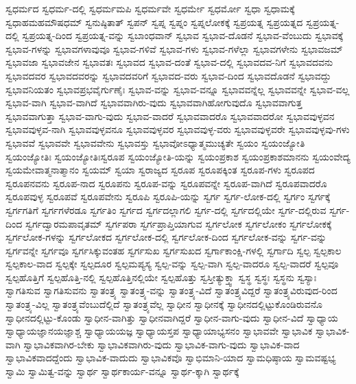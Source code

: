 {ಸ್ವಧರ್ಮದ
ಸ್ವಧರ್ಮ-ದಲ್ಲಿ
ಸ್ವಧರ್ಮಮಪಿ
ಸ್ವಧರ್ಮವೇ
ಸ್ವಧರ್ಮೇ
ಸ್ವಧರ್ಮೋ
ಸ್ವಧಾ
ಸ್ವಧಾಮಕ್ಕೆ
ಸ್ವಧಾಹಮಹಮೌಷಧಮ್
ಸ್ವನುಷ್ಠಿತಾತ್
ಸ್ವಪನ್
ಸ್ವಪ್ನ
ಸ್ವಪ್ನಂ
ಸ್ವಪ್ನಲೋಕಕ್ಕೆ
ಸ್ವಪ್ರಯತ್ನ
ಸ್ವಪ್ರಯತ್ನದ
ಸ್ವಪ್ರಯತ್ನ-ದಲ್ಲಿ
ಸ್ವಪ್ರಯತ್ನ-ದಿಂದ
ಸ್ವಪ್ರಯತ್ನ-ವನ್ನು
ಸ್ವಬಾಂಧವಾನ್
ಸ್ವಭಾವ
ಸ್ವಭಾವ-ದೊಡನೆ
ಸ್ವಭಾವ-ವೆಂಬುದು
ಸ್ವಭಾವಕ್ಕೆ
ಸ್ವಭಾವ-ಗಳನ್ನು
ಸ್ವಭಾವಗಳಾವುವೂ
ಸ್ವಭಾವ-ಗಳಿವೆ
ಸ್ವಭಾವ-ಗಳು
ಸ್ವಭಾವ-ಗಳೆಲ್ಲಾ
ಸ್ವಭಾವಗಳೇನು
ಸ್ವಭಾವಜಮ್
ಸ್ವಭಾವಜಾ
ಸ್ವಭಾವಜೇನ
ಸ್ವಭಾವತಃ
ಸ್ವಭಾವದ
ಸ್ವಭಾವ-ದಂತೆ
ಸ್ವಭಾವ-ದಲ್ಲಿ
ಸ್ವಭಾವದವ-ನಿಗೆ
ಸ್ವಭಾವದವನು
ಸ್ವಭಾವದವರ
ಸ್ವಭಾವದವರನ್ನು
ಸ್ವಭಾವದವರಿಗೆ
ಸ್ವಭಾವದ-ವರು
ಸ್ವಭಾವ-ದಿಂದ
ಸ್ವಭಾವದೊಡನೆ
ಸ್ವಭಾವದ್ದು
ಸ್ವಭಾವನಿಯತಂ
ಸ್ವಭಾವಪ್ರಭವೈರ್ಗುಣೈಃ
ಸ್ವಭಾವ-ವನ್ನು
ಸ್ವಭಾವ-ವನ್ನೂ
ಸ್ವಭಾವವನ್ನೆಲ್ಲ
ಸ್ವಭಾವವನ್ನೇ
ಸ್ವಭಾವ-ವಲ್ಲ
ಸ್ವಭಾವ-ವಾಗಿ
ಸ್ವಭಾವ-ವಾಗಿದೆ
ಸ್ವಭಾವವಾಗಿರು-ವುದು
ಸ್ವಭಾವವಾಗಿಹೋಗುವುದೊ
ಸ್ವಭಾವವಾಗುತ್ತ
ಸ್ವಭಾವವಾಗುತ್ತಾ
ಸ್ವಭಾವ-ವಾಗು-ವುದು
ಸ್ವಭಾವ-ವಾದರೆ
ಸ್ವಭಾವವಾದರೊ
ಸ್ವಭಾವವಾದರೋ
ಸ್ವಭಾವವುಳ್ಳವನ
ಸ್ವಭಾವವುಳ್ಳವ-ನಾಗಿ
ಸ್ವಭಾವವುಳ್ಳವನೂ
ಸ್ವಭಾವವುಳ್ಳವರ
ಸ್ವಭಾವವುಳ್ಳ-ವರು
ಸ್ವಭಾವವುಳ್ಳವರೇ
ಸ್ವಭಾವವುಳ್ಳವು-ಗಳು
ಸ್ವಭಾವವೆ
ಸ್ವಭಾವವೇ
ಸ್ವಭಾವವೇನು
ಸ್ವಭಾವಸ್ತು
ಸ್ವಭಾವೋಽಧ್ಯಾತ್ಮಮುಚ್ಯತೇ
ಸ್ವಯಂ
ಸ್ವಯಂಜ್ಯೋತಿ
ಸ್ವಯಂಜ್ಯೋತಿಃ
ಸ್ವಯಂಜ್ಯೋತಿಃಸ್ವರೂಪ
ಸ್ವಯಂಜ್ಯೋತಿ-ಯನ್ನು
ಸ್ವಯಂಪ್ರಕಾಶ
ಸ್ವಯಂಪ್ರಕಾಶಮಾನನು
ಸ್ವಯಂವೇದ್ಯ
ಸ್ವಯಮೇವಾತ್ಮನಾತ್ಮಾನಂ
ಸ್ವಯಮ್
ಸ್ವಯಾ
ಸ್ವರಾಜ್ಯದ
ಸ್ವರೂಪ
ಸ್ವರೂಪಕ್ಕಿಂತ
ಸ್ವರೂಪ-ಗಳು
ಸ್ವರೂಪದ
ಸ್ವರೂಪನವನು
ಸ್ವರೂಪ-ನಾದ
ಸ್ವರೂಪನು
ಸ್ವರೂಪ-ವನ್ನು
ಸ್ವರೂಪವನ್ನೇ
ಸ್ವರೂಪ-ವಾಗಿದೆ
ಸ್ವರೂಪವಾದರೊ
ಸ್ವರೂಪವುಳ್ಳ
ಸ್ವರೂಪವೆ
ಸ್ವರೂಪವೇನು
ಸ್ವರೂಪಿ
ಸ್ವರೂಪಿ-ಯನ್ನು
ಸ್ವರ್ಗ
ಸ್ವರ್ಗ-ಲೋಕ-ದಲ್ಲಿ
ಸ್ವರ್ಗಂ
ಸ್ವರ್ಗಕ್ಕೆ
ಸ್ವರ್ಗಗತಿಗೆ
ಸ್ವರ್ಗಗಳೆರಡೂ
ಸ್ವರ್ಗತಿಂ
ಸ್ವರ್ಗದ
ಸ್ವರ್ಗದಲ್ಲಾಗಲಿ
ಸ್ವರ್ಗ-ದಲ್ಲಿ
ಸ್ವರ್ಗದಲ್ಲಿಯೇ
ಸ್ವರ್ಗ-ದಲ್ಲಿರುವ
ಸ್ವರ್ಗ-ದಿಂದ
ಸ್ವರ್ಗದ್ವಾರಮಪಾವೃತಮ್
ಸ್ವರ್ಗಪರಾ
ಸ್ವರ್ಗಪ್ರಾಪ್ತಿಯಾಗುವ
ಸ್ವರ್ಗಲೋಕ
ಸ್ವರ್ಗಲೋಕಂ
ಸ್ವರ್ಗಲೋಕಕ್ಕೆ
ಸ್ವರ್ಗಲೋಕ-ಗಳನ್ನು
ಸ್ವರ್ಗಲೋಕದ
ಸ್ವರ್ಗಲೋಕ-ದಲ್ಲಿ
ಸ್ವರ್ಗಲೋಕ-ದಿಂದ
ಸ್ವರ್ಗಲೋಕ-ವನ್ನು
ಸ್ವರ್ಗ-ವನ್ನು
ಸ್ವರ್ಗವನ್ನೇ
ಸ್ವರ್ಗವೂ
ಸ್ವರ್ಗಸಿಕ್ಕುವಂತಹ
ಸ್ವರ್ಗಸುಖ
ಸ್ವರ್ಗಸುಖದ
ಸ್ವರ್ಗಾಕಾಂಕ್ಷಿ-ಗಳಲ್ಲಿ
ಸ್ವರ್ಗಾದಿ
ಸ್ವಲ್ಪ
ಸ್ವಲ್ಪಕಾಲ
ಸ್ವಲ್ಪಕಾಲ-ವಾದ
ಸ್ವಲ್ಪಕ್ಕೇ
ಸ್ವಲ್ಪದೂರ
ಸ್ವಲ್ಪಮಪ್ಯಸ್ಯ
ಸ್ವಲ್ಪ-ವನ್ನು
ಸ್ವಲ್ಪ-ವಾಗಿ
ಸ್ವಲ್ಪ-ವಾದರೂ
ಸ್ವಲ್ಪ-ವಾದರೆ
ಸ್ವಲ್ಪವೂ
ಸ್ವಲ್ಪಹೊತ್ತಿಗೆ
ಸ್ವಲ್ಪಹೊತ್ತಿ-ನಲ್ಲಿ
ಸ್ವಲ್ಪಹೊತ್ತಿನಲ್ಲಿಯೇ
ಸ್ವಲ್ಪಹೊತ್ತು
ಸ್ವಸ್ತೀತ್ಯುಕ್ತ್ವಾ
ಸ್ವಸ್ಥ
ಸ್ವಸ್ಥಃ
ಸ್ವಸ್ಥನು
ಸ್ವಸ್ಯಾಃ
ಸ್ವಾಗತಿಸುವ
ಸ್ವಾಗತಿಸುವನು
ಸ್ವಾತಂತ್ರ್ಯ
ಸ್ವಾತಂತ್ರ್ಯ-ವನ್ನು
ಸ್ವಾತಂತ್ರ್ಯ-ವಿದೆ
ಸ್ವಾತಂತ್ರ್ಯವಿದ್ದರೆ
ಸ್ವಾತಂತ್ರ್ಯವಿರುವುದ-ರಿಂದ
ಸ್ವಾತಂತ್ರ್ಯ-ವಿಲ್ಲ
ಸ್ವಾತಂತ್ರ್ಯವೆಂಬುದೆಲ್ಲಿದೆ
ಸ್ವಾತಂತ್ರ್ಯವೆಲ್ಲ
ಸ್ವಾಧೀನ
ಸ್ವಾಧೀನಕ್ಕೆ
ಸ್ವಾಧೀನದಲ್ಲಿಟ್ಟುಕೊಂಡಿರುವನೊ
ಸ್ವಾಧೀನದಲ್ಲಿಟ್ಟು-ಕೊಂಡು
ಸ್ವಾಧೀನ-ವಾಗಿತ್ತು
ಸ್ವಾಧೀನವಾಗಿದ್ದರೆ
ಸ್ವಾಧೀನ-ವಾಗು-ವುದು
ಸ್ವಾಧೀನ-ವಿದೆ
ಸ್ವಾಧ್ಯಾಯ
ಸ್ವಾಧ್ಯಾಯಜ್ಞಾನಯಜ್ಞಾಶ್ಚ
ಸ್ವಾಧ್ಯಾಯಯಜ್ಞ
ಸ್ವಾಧ್ಯಾಯಸ್ತಪ
ಸ್ವಾಧ್ಯಾಯಾಭ್ಯಸನಂ
ಸ್ವಾಭಾವವೇ
ಸ್ವಾಭಾವಿಕ
ಸ್ವಾಭಾವಿಕ-ವಾಗಿ
ಸ್ವಾಭಾವಿಕವಾಗಿರ-ಬೇಕು
ಸ್ವಾಭಾವಿಕವಾಗಿರು-ವುದು
ಸ್ವಾಭಾವಿಕ-ವಾಗು-ವುದು
ಸ್ವಾಭಾವಿಕ-ವಾದ
ಸ್ವಾಭಾವಿಕವಾದದ್ದೆಂದು
ಸ್ವಾಭಾವಿಕ-ವಾದುದು
ಸ್ವಾಭಾವಿಕವೊ
ಸ್ವಾಭಿಮಾನಿ-ಯಾದ
ಸ್ವಾಮಧಿಷ್ಠಾಯ
ಸ್ವಾಮವಷ್ಟಭ್ಯ
ಸ್ವಾಮಿ
ಸ್ವಾಮಿತ್ವ-ವನ್ನು
ಸ್ವಾರ್ಥ
ಸ್ವಾರ್ಥಕಾರ್ಯ-ವನ್ನೂ
ಸ್ವಾರ್ಥ-ಕ್ಕಾಗಿ
ಸ್ವಾರ್ಥಕ್ಕೆ
}
